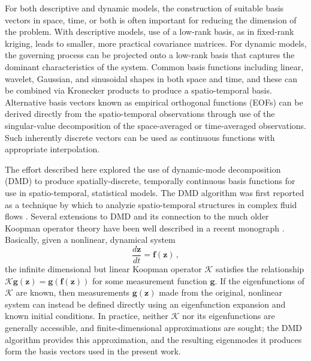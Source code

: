 \documentclass[review,number,sort&compress,12pt]{elsarticle}
\begin{document}
For both descriptive and dynamic models, the construction of suitable basis vectors in space, time, or both is often important for reducing the dimension of the problem.
With descriptive models, use of a low-rank basis, as in fixed-rank kriging, leads to smaller, more practical covariance matrices.
For dynamic models, the governing process can be projected onto a low-rank basis that captures the dominant characteristics of the system.
Common basis functions including linear, wavelet, Gaussian, and sinusoidal shapes in both space and time, and these can be combined via Kronecker products to produce a spatio-temporal basis.
Alternative basis vectors known as empirical orthogonal functions (EOFs) can be derived directly from the spatio-temporal observations through use of the singular-value decomposition of the space-averaged or time-averaged observations.
Such inherently discrete vectors can be used as continuous functions with appropriate interpolation.

The effort described here explored the use of dynamic-mode decomposition (DMD) \cite{schmid:hal-01053394} to produce spatially-discrete, temporally continuous basis functions for use in spatio-temporal, statistical models.
The DMD algorithm was first reported as a technique by which to analyzie spatio-temporal structures in complex fluid flows \cite{schmid:hal-01053394, schmid2010dynamic}.
Several extensions to DMD and its connection to the much older Koopman operator theory have been well described in a recent monograph \cite{kutzbook}.  
Basically, given a nonlinear, dynamical system
\begin{equation}
  \frac{d\mathbf{z}}{dt} = \mathbf{f}(\mathbf{z}) \, ,
  \label{eq:dynamicalsystem}
\end{equation}
the infinite dimensional but linear Koopman operator $\mathcal{K}$ satisfies the relationship $\mathcal{K}\mathbf{g}(\mathbf{z}) = \mathbf{g}(\mathbf{f}(\mathbf{z}))$ for some measurement function $\mathbf{g}$.
If the eigenfunctions of $\mathcal{K}$ are known, then measurements $\mathbf{g}(\mathbf{z})$ made from the original, nonlinear system can instead be defined directly using an eigenfunction expansion and known initial conditions.
In practice, neither $\mathcal{K}$ nor its eigenfunctions are generally accessible, and finite-dimensional approximations are sought; the DMD algorithm provides this approximation, and the resulting eigenmodes it produces form the basis vectors used in the present work.
\end{document}
